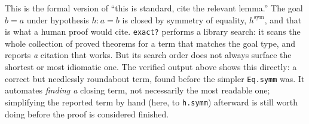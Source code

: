 \begin{mathreading}

This is the formal version of ``this is standard, cite the relevant lemma.'' The goal \(b = a\) under hypothesis \(h : a = b\) is closed by symmetry of equality, \(h^{\mathrm{sym}}\), and that is what a human proof would cite. \texttt{exact?} performs a library search: it scans the whole collection of proved theorems for a term that matches the goal type, and reports \emph{a} citation that works. But its search order does not always surface the shortest or most idiomatic one. The verified output above shows this directly: a correct but needlessly roundabout term, found before the simpler \texttt{Eq.symm} was. It automates \emph{finding a} closing term, not necessarily the most readable one; simplifying the reported term by hand (here, to \texttt{h.symm}) afterward is still worth doing before the proof is considered finished.

\end{mathreading}
